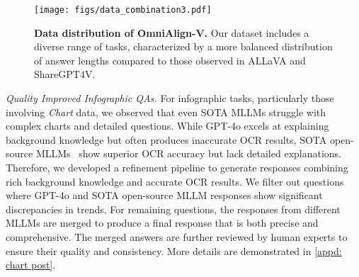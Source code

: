 \begin{figure}[t]
    \centering
    \texttt{[image: figs/data\_combination3.pdf]}
    \caption{\textbf{Data distribution of OmniAlign-V.} Our dataset includes a diverse range of tasks, characterized by a more balanced distribution of answer lengths compared to those observed in ALLaVA and ShareGPT4V.}
    \label{fig:data_combination}
    \vspace{-10pt}
\end{figure}

\textit{Quality Improved Infographic QAs. }
For infographic tasks, particularly those involving \textit{Chart} data, 
we observed that even SOTA MLLMs struggle with complex charts and detailed questions.
While GPT-4o excels at explaining background knowledge but often produces inaccurate OCR results, 
SOTA open-source MLLMs~\cite{chen2024far,bai2023qwen} show superior OCR accuracy but lack detailed explanations. 
Therefore, we developed a refinement pipeline to generate responses combining rich background knowledge and accurate OCR results. 
We filter out questions where GPT-4o and SOTA open-source MLLM responses show significant discrepancies in trends. 
For remaining questions, the responses from different MLLMs are merged to produce a final response that is both precise and comprehensive.
The merged answers are further reviewed by human experts to ensure their quality and consistency. More details are demonstrated in \cref{appd: chart post}.




